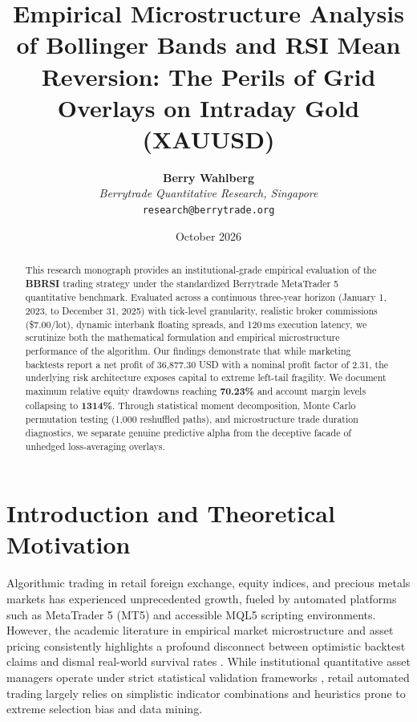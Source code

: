 \documentclass[11pt,a4paper]{article}
\title{\textbf{Empirical Microstructure Analysis of Bollinger Bands and RSI Mean Reversion: The Perils of Grid Overlays on Intraday Gold (XAUUSD)}}
\author{
    \textbf{Berry Wahlberg} \\
    \textit{Berrytrade Quantitative Research, Singapore} \\
    \texttt{research@berrytrade.org}
}
\date{October 2026}
\begin{document}
\maketitle

\begin{abstract}
This research monograph provides an institutional-grade empirical evaluation of the \textbf{BBRSI} trading strategy under the standardized Berrytrade MetaTrader 5 quantitative benchmark. Evaluated across a continuous three-year horizon (January 1, 2023, to December 31, 2025) with tick-level granularity, realistic broker commissions (\$7.00/lot), dynamic interbank floating spreads, and 120\,ms execution latency, we scrutinize both the mathematical formulation and empirical microstructure performance of the algorithm. Our findings demonstrate that while marketing backtests report a net profit of 36,877.30 USD with a nominal profit factor of 2.31, the underlying risk architecture exposes capital to extreme left-tail fragility. We document maximum relative equity drawdowns reaching \textbf{70.23\%} and account margin levels collapsing to \textbf{1314\%}. Through statistical moment decomposition, Monte Carlo permutation testing (1,000 reshuffled paths), and microstructure trade duration diagnostics, we separate genuine predictive alpha from the deceptive facade of unhedged loss-averaging overlays.
\end{abstract}

\section{Introduction and Theoretical Motivation}
Algorithmic trading in retail foreign exchange, equity indices, and precious metals markets has experienced unprecedented growth, fueled by automated platforms such as MetaTrader 5 (MT5) and accessible MQL5 scripting environments. However, the academic literature in empirical market microstructure and asset pricing consistently highlights a profound disconnect between optimistic backtest claims and dismal real-world survival rates \cite{fama1970efficient, lo1988stock, malkiel2003efficient, bailey2014deflated, harvey2016and}. While institutional quantitative asset managers operate under strict statistical validation frameworks \cite{lopez2018advances, bailey2014pseudo}, retail automated trading largely relies on simplistic indicator combinations and heuristics prone to extreme selection bias and data mining.
\end{document}
